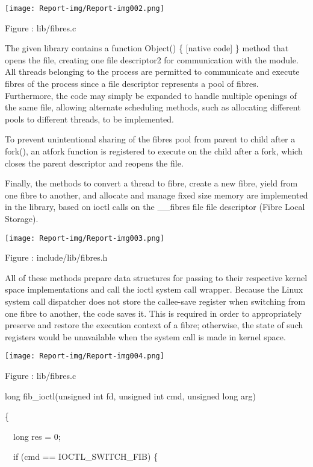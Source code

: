 \bigskip

 \texttt{[image: Report-img/Report-img002.png]} 

Figure : lib/fibres.c

The given library contains a function Object() \{ [native code] \} method that opens the file, creating one file descriptor2 for communication with the module. All threads belonging to the process are permitted to communicate and execute fibres of the process since a file descriptor represents a pool of fibres. Furthermore, the code may simply be expanded to handle multiple openings of the same file, allowing alternate scheduling methods, such as allocating different pools to different threads, to be implemented.

To prevent unintentional sharing of the fibres pool from parent to child after a fork(), an atfork function is registered to execute on the child after a fork, which closes the parent descriptor and reopens the file.

Finally, the methods to convert a thread to fibre, create a new fibre, yield from one fibre to another, and allocate and manage fixed size memory are implemented in the library, based on ioctl calls on the \_\_fibres file file descriptor (Fibre Local Storage).


\bigskip

 \texttt{[image: Report-img/Report-img003.png]} 

Figure : include/lib/fibres.h

All of these methods prepare data structures for passing to their respective kernel space implementations and call the ioctl system call wrapper. Because the Linux system call dispatcher does not store the callee-save register when switching from one fibre to another, the code saves it. This is required in order to appropriately preserve and restore the execution context of a fibre; otherwise, the state of such registers would be unavailable when the system call is made in kernel space.

 \texttt{[image: Report-img/Report-img004.png]} 

Figure : lib/fibres.c

long fib\_ioctl(unsigned int fd, unsigned int cmd, unsigned long arg)

\{

\ \ long res = 0;

\ \ if (cmd == IOCTL\_SWITCH\_FIB) \{

